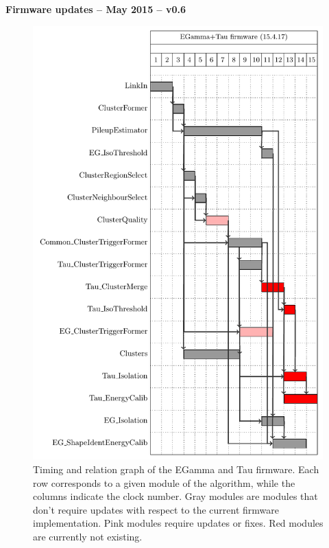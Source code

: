 \documentclass[a4paper, 12pt]{article}
\begin{document}
\renewcommand{\contentsname}{}


\begin{center}
{\LARGE \bf Firmware updates -- May 2015 -- v0.6}\\
\end{center}


\begin{figure}[hbtp]
  \begin{center}
    \includegraphics[width=11.2cm]{./gantt_charts/firmware_egAndTau_mod.pdf}
    \caption{Timing and relation graph of the EGamma and Tau firmware. Each row corresponds to a given module of the algorithm, while the columns indicate the clock number. Gray modules are modules that don't require updates with respect to the current firmware implementation. Pink modules require updates or fixes. Red modules are currently not existing.}
    \label{fig:gantt}
  \end{center}
\end{figure}
\end{document}
